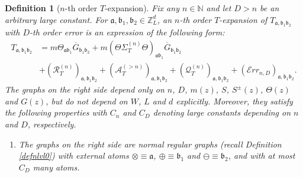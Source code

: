 \documentclass{article}
\newcommand{\1}{\mathds{1}}
\numberwithin{equation}{section}
\newcommand{\be}{\begin{equation}}
\newcommand{\ee}{\end{equation}}
\newcommand{\fa}{{\mathfrak a}}
\newcommand{\fb}{{\mathfrak b}}
\renewcommand{\leq}{\leqslant}
\renewcommand{\le}{\leq}
\newcommand{\N}{\mathbb{N}}
\newcommand{\Z}{\mathbb{Z}}
\DeclareMathOperator{\OO}{O}
\theoremstyle{plain} %
\newtheorem{definition}[theorem]{Definition}
\theoremstyle{remark}
\newcommand{\Sdelta}{{\Sigma}_T}
\newcommand{\PTn}{\mathcal R_T^{(n)}}
\newcommand{\QTn}{\mathcal Q_T^{(n)}}
\newcommand{\ATn}{\mathcal A_T^{(>n)}}
\newcommand{\Err}{{\mathcal Err}}
\begin{document}
\begin{definition} [$n$-th order $T$-expansion]\label{defn genuni}
Fix any $n\in \N$ and let $D>n$ be an arbitrary large constant. For $\fa, \fb_1,\fb_2 \in \Z_L^d$, an $n$-th order $T$-expansion of $T_{\fa,\fb_1\fb_2}$ with $D$-th order error is an expression of the following form: %
\be\label{mlevelTgdef}
\begin{split}
T_{\fa,\fb_1 \fb_2}&= m  \Theta_{\fa \fb_1}\overline G_{\fb_1\fb_2} +m   (\Theta \Sdelta^{(n)}\Theta)_{\fa\fb_1} \overline G_{\fb_1\fb_2} \\
&+ (\PTn)_{\fa,\fb_1 \fb_2} +  (\ATn)_{\fa,\fb_1\fb_2}  + (\QTn)_{\fa,\fb_1\fb_2}  +  (\Err_{n,D})_{\fa,\fb_1\fb_2}.
\end{split}
\ee
The graphs on the right side depend only on $n$, $D$, $m(z)$, $S$, $S^{\pm}(z)$, $\Theta(z)$ and $G(z)$, but do not depend on $W$, $L$ and $d$ explicitly. Moreover, they satisfy the following properties with $C_n$ and $C_D$ denoting large constants depending on $n$ and $D$, respectively.
\begin{enumerate}
\item  The graphs on the right side are normal regular graphs (recall Definition \ref{defnlvl0}) with external atoms $\otimes\equiv \fa$, $\oplus\equiv \fb_1$ and $\ominus\equiv \fb_2$, and with at most $C_D$ many atoms.


\end{enumerate}
\end{definition}
\end{document}

